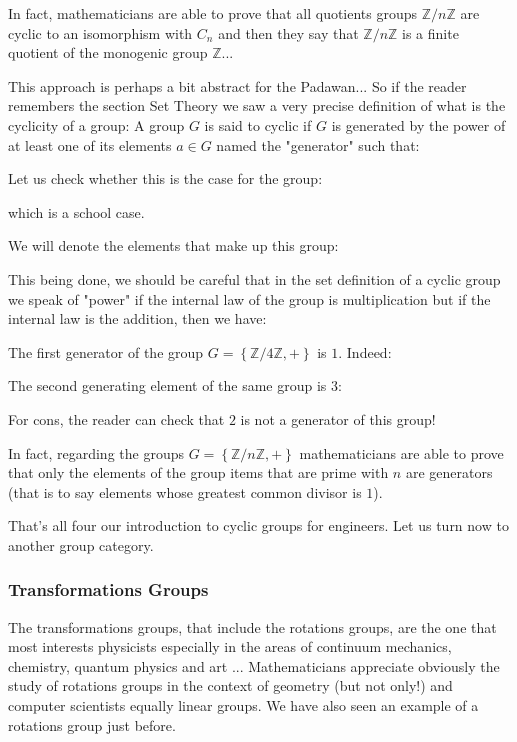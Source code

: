 	In fact, mathematicians are able to prove that all quotients groups $\mathbb{Z}/n\mathbb{Z}$ are cyclic to an isomorphism with $C_n$ and then they say that $\mathbb{Z}/n\mathbb{Z}$ is a finite quotient of the  monogenic group $\mathbb{Z}$...
	
	This approach is perhaps a bit abstract for the Padawan... So if the reader remembers the section Set Theory we saw a very precise definition of what is the cyclicity of a group: A group $G$ is said to cyclic if $G$ is generated by the power of at least one of its elements $a\in G$ named the "generator" such that:
	
	Let us check whether this is the case for the group:
	
	which is a school case.
	
	We will denote the elements that make up this group:
	
	This being done, we should be careful that in the set definition of a cyclic group we speak of "power" if the internal law of the group is multiplication but if the internal law is the addition, then we have:
	
	The first generator of the group $G=\left\lbrace \mathbb{Z}/4\mathbb{Z},+ \right\rbrace$ is $1$. Indeed:
	
	The second generating element of the same group is $3$:
	
	For cons, the reader can check that $2$ is not a generator of this group!
	
	In fact, regarding the groups $G=\left\lbrace \mathbb{Z}/n\mathbb{Z},+ \right\rbrace$ mathematicians are able to prove that only the elements of the group items that are prime with $n$ are generators (that is to say elements whose greatest common divisor is $1$).
	
	That's all four our introduction to cyclic groups for engineers. Let us turn now to another group category.
	
	\subsubsection{Transformations Groups}
	The transformations groups, that include the rotations groups, are the one that most interests physicists especially in the areas of continuum mechanics, chemistry, quantum physics and art ... Mathematicians appreciate obviously the study of rotations groups in the context of geometry (but not only!) and computer scientists equally linear groups. We have also seen an example of a rotations group just before.
	
